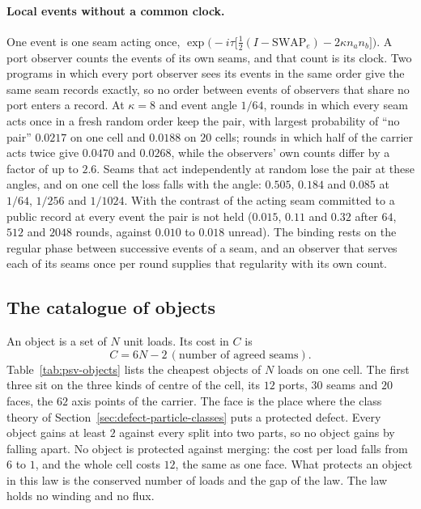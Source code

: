 \paragraph{Local events without a common clock.}
One event is one seam acting once,
$\exp\bigl(-i\tau\bigl[\tfrac12(I-\mathrm{SWAP}_e)-2\kappa n_an_b\bigr]\bigr)$. A port
observer counts the events of its own seams, and that count is its clock. Two programs in
which every port observer sees its events in the same order give the same seam records
exactly, so no order between events of observers that share no port enters a record. At
$\kappa=8$ and event angle $1/64$, rounds in which every seam acts once in a fresh random
order keep the pair, with largest probability of ``no pair'' $0.0217$ on one cell and
$0.0188$ on $20$ cells; rounds in which half of the carrier acts twice give $0.0470$ and
$0.0268$, while the observers' own counts differ by a factor of up to $2.6$. Seams that
act independently at random lose the pair at these angles, and on one cell the
loss falls with the angle: $0.505$, $0.184$ and $0.085$ at $1/64$, $1/256$ and $1/1024$.
With the contrast of the acting seam committed to a public record at every event the pair
is not held ($0.015$, $0.11$ and $0.32$ after $64$, $512$ and $2048$ rounds, against $0.010$
to $0.018$ unread). The binding rests on the regular phase between successive events of a
seam, and an observer that serves each of its seams once per round supplies that
regularity with its own count.

\subsection{The catalogue of objects}
\label{sec:psv-catalogue}

An object is a set of $N$ unit loads. Its cost in $C$ is
\[
 C=6N-2\,(\text{number of agreed seams}).
\]
Table~\ref{tab:psv-objects} lists the cheapest objects of $N$ loads on one cell. The first
three sit on the three kinds of centre of the cell, its $12$ ports, $30$ seams and $20$
faces, the $62$ axis points of the carrier. The face is the place where the class theory of
Section~\ref{sec:defect-particle-classes} puts a protected defect. Every object gains at
least $2$ against every split into two parts, so no object gains by falling apart. No
object is protected against merging: the cost per load falls from $6$ to $1$, and the whole
cell costs $12$, the same as one face. What protects an object in this law is the
conserved number of loads and the gap of the law. The law holds no winding and no flux.

